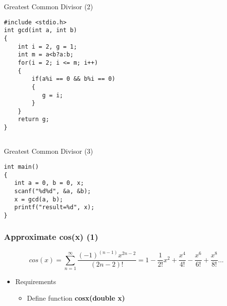 \ifx\answer\undefined
\begin{frame}[fragile]{Greatest Common Divisor (2)}
\begin{lstlisting}[xleftmargin=0.05\linewidth, linewidth=0.9\linewidth]
#include <stdio.h>
int gcd(int a, int b)
{
    int i = 2, g = 1;
    int m = a<b?a:b;
    for(i = 2; i <= m; i++)
    {
        if(a%i == 0 && b%i == 0)
        {
           g = i;
        }
    }
    return g;
}


\end{lstlisting}
\end{frame}
\fi

\ifx\answer\undefined
\begin{frame}[fragile]{Greatest Common Divisor (3)}
\begin{lstlisting}[firstnumber=19,xleftmargin=0.05\linewidth, linewidth=0.9\linewidth]
int main()
{
   int a = 0, b = 0, x;
   scanf("%d%d", &a, &b);
   x = gcd(a, b);
   printf("result=%d", x);
}
\end{lstlisting}
\end{frame}
\fi


\begin{frame}
\frametitle{Approximate cos(x) (1)}
\begin{equation}
	cos(x)=\sum_{n=1}^{\infty}\frac{(-1)^{(n-1)}x^{2n-2}}{(2n-2)!}=1-\frac{1}{2!}x^2+\frac{x^4}{4!}-\frac{x^6}{6!}+\frac{x^8}{8!}...
\end{equation}
\begin{itemize}
	\item {Requirements}
	\begin{itemize}
		\item {Define function \textbf{cosx(double x)}}
	\end{itemize}
\end{itemize}
\end{frame}


